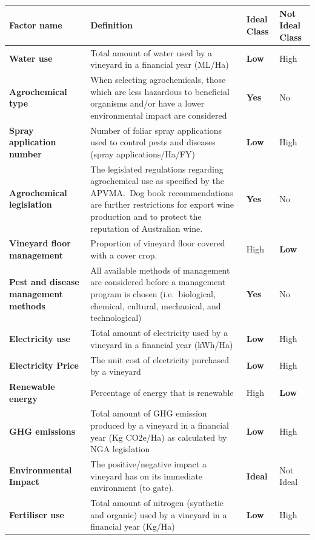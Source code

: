 \documentclass[fleqn,10pt]{wlscirep}
\begin{document}
\begin{table}[h]
    \begin{tabular}{@{}llll@{}}
    \toprule
    \textbf{Factor name} & Definition & \textbf{Ideal Class} & Not Ideal Class \\ \midrule
    \textbf{Water use} & Total amount of water used by a vineyard in a financial year (ML/Ha) & \textbf{Low} & High \\
    \textbf{Agrochemical type} & When selecting agrochemicals, those which are less hazardous to beneficial organisms and/or have a lower environmental impact are considered & \textbf{Yes} & No \\
    \textbf{Spray application number} & Number of foliar spray applications used to control pests and diseases (spray applications/Ha/FY) & \textbf{Low} & High \\
    \textbf{Agrochemical legislation} & The legislated regulations regarding agrochemical use as specified by the APVMA.~Dog book recommendations are further restrictions for export wine production and to protect the reputation of Australian wine. & \textbf{Yes} & No \\
    \textbf{Vineyard floor management} & Proportion of vineyard floor covered with a cover crop. & High & \textbf{Low} \\
    \textbf{Pest and disease management methods} & All available methods of management are considered before a management program is chosen (i.e.~biological, chemical, cultural, mechanical, and technological) & \textbf{Yes} & No \\
    \textbf{Electricity use} & Total amount of electricity used by a vineyard in a financial year (kWh/Ha) & \textbf{Low} & High \\
    \textbf{Electricity Price} & The unit cost of electricity purchased by a vineyard & \textbf{Low} & High \\
    \textbf{Renewable energy} & Percentage of energy that is renewable & High & \textbf{Low} \\
    \textbf{GHG emissions} & Total amount of GHG emission produced by a vineyard in a financial year (Kg CO2e/Ha) as calculated  by NGA legislation & \textbf{Low} & High \\
    \textbf{Environmental Impact} & The positive/negative impact a vineyard has on its immediate environment (to gate). & \textbf{Ideal} & Not Ideal \\
    \textbf{Fertiliser use} & Total amount of nitrogen (synthetic and organic) used by a vineyard in a financial year (Kg/Ha) & \textbf{Low} & High \\

\end{tabular}
\end{table}
\end{document}
